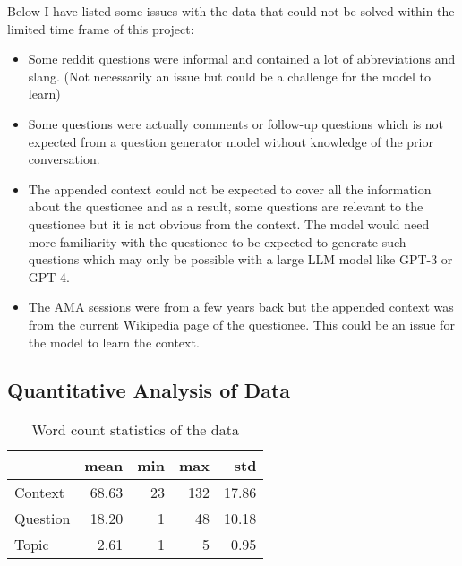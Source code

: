 \documentclass[paper=a4, fontsize=11pt]{scrartcl}
\numberwithin{equation}{section}		%
\numberwithin{figure}{section}			%
\numberwithin{table}{section}				%
\begin{document}
Below I have listed some issues with the data that could not be solved within the limited time frame of this project:
\begin{itemize}
  \item Some reddit questions were informal and contained a lot of abbreviations and slang. (Not necessarily an issue but could be a challenge for the model to learn)
  \item Some questions were actually comments or follow-up questions which is not expected from a question generator model without knowledge of the prior conversation.
  \item The appended context could not be expected to cover all the information about the questionee and as a result, some questions are relevant to the questionee but it is not obvious from the context. The model would need more familiarity with the questionee to be expected to generate such questions which may only be possible with a large LLM model like GPT-3 or GPT-4.
  \item The AMA sessions were from a few years back but the appended context was from the current Wikipedia page of the questionee. This could be an issue for the model to learn the context.
\end{itemize}

\subsection*{Quantitative Analysis of Data}
\begin{table}
  \small
  \centering
  \begin{tabular}{lrrrr}
    \hline
     & mean & min & max & std \\
    \hline
    Context & 68.63 & 23 & 132 & 17.86 \\
    Question & 18.20 & 1 & 48 & 10.18 \\
    Topic & 2.61 & 1 & 5 & 0.95 \\
    \hline
    \end{tabular}
    \caption{Word count statistics of the data}
    \label{tab:data_stats}
\end{table}
\end{document}
